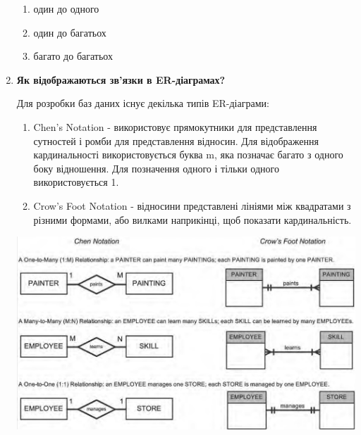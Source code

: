 \begin{enumerate}
\begin{enumerate}
    \item один до одного
    \item один до багатьох
    \item багато до багатьох
\end{enumerate}

\item \textbf{Як відображаються зв'язки в ER-діаграмах?}

Для розробки баз даних існує декілька типів ER-діаграми:

\begin{enumerate}
    \item Chen's Notation - використовує прямокутники для представлення сутностей і ромби для представлення відносин.
          Для відображення кардинальності використовується буква m, яка позначає багато з одного боку відношення.
          Для позначення одного і тільки одного використовується 1.
    \item Crow's Foot Notation - відносини представлені лініями між квадратами з різними формами,
          або вилками наприкінці, щоб показати кардинальність.
\end{enumerate}

\includegraphics[width=1\linewidth]{../assets/chen-crowsfoot-notation.jpg}

\end{enumerate}
